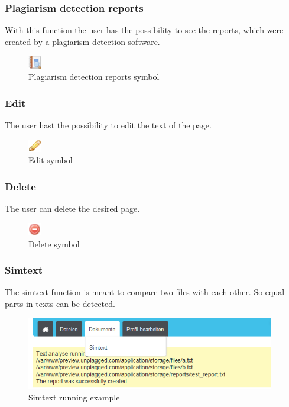 \subsubsection{Plagiarism detection reports}
With this function the user has the possibility to see the reports, which were created by a plagiarism detection software.
\begin{figure}[!ht]
  \centering
    \includegraphics[width=0.05\textwidth]{images/basic_functionalities/report_magnify.png}
  \caption{Plagiarism detection reports symbol}
  \label{fig:plagiarism detection reports symbol}
\end{figure}


\subsubsection{Edit}
The user hast the possibility to edit the text of the page.
\begin{figure}[!ht]
  \centering
    \includegraphics[width=0.05\textwidth]{images/basic_functionalities/pencil.png}
  \caption{Edit symbol}
  \label{fig:edit symbol}
\end{figure}

\subsubsection{Delete}
The user can delete the desired page.
\begin{figure}[!ht]
  \centering
    \includegraphics[width=0.05\textwidth]{images/basic_functionalities/delete.png}
  \caption{Delete symbol}
  \label{fig:delete symbol}
\end{figure}

\subsubsection{Simtext}

The simtext function is meant to compare two files with each other. So equal parts in texts can be detected.

\begin{figure}[!ht]
  \centering
    \includegraphics[width=0.97\textwidth]{images/basic_functionalities/simtext_running.png}
  \caption{Simtext running example}
  \label{fig: Simtext running example}
\end{figure}

